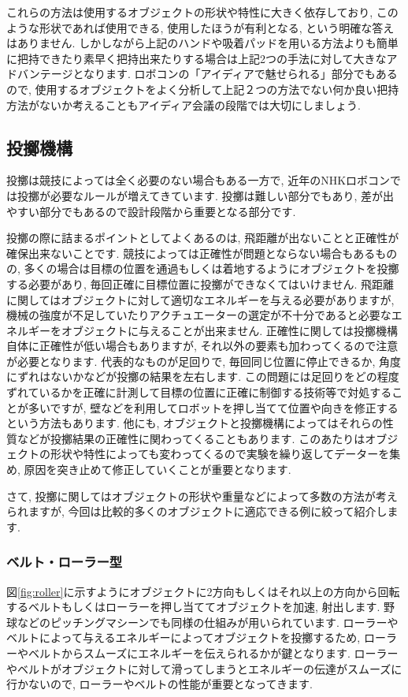 これらの方法は使用するオブジェクトの形状や特性に大きく依存しており, このような形状であれば使用できる, 使用したほうが有利となる, という明確な答えはありません. 
しかしながら上記のハンドや吸着パッドを用いる方法よりも簡単に把持できたり素早く把持出来たりする場合は上記2つの手法に対して大きなアドバンテージとなります. ロボコンの「アイディアで魅せられる」部分でもあるので, 使用するオブジェクトをよく分析して上記２つの方法でない何か良い把持方法がないか考えることもアイディア会議の段階では大切にしましょう.
\subsection{投擲機構}
投擲は競技によっては全く必要のない場合もある一方で, 近年のNHKロボコンでは投擲が必要なルールが増えてきています. 投擲は難しい部分でもあり, 差が出やすい部分でもあるので設計段階から重要となる部分です. 

投擲の際に詰まるポイントとしてよくあるのは, 飛距離が出ないことと正確性が確保出来ないことです. 競技によっては正確性が問題とならない場合もあるものの, 多くの場合は目標の位置を通過もしくは着地するようにオブジェクトを投擲する必要があり, 毎回正確に目標位置に投擲ができなくてはいけません. 
飛距離に関してはオブジェクトに対して適切なエネルギーを与える必要がありますが, 機械の強度が不足していたりアクチュエーターの選定が不十分であると必要なエネルギーをオブジェクトに与えることが出来ません. 正確性に関しては投擲機構自体に正確性が低い場合もありますが, それ以外の要素も加わってくるので注意が必要となります. 代表的なものが足回りで, 毎回同じ位置に停止できるか, 角度にずれはないかなどが投擲の結果を左右します. この問題には足回りをどの程度ずれているかを正確に計測して目標の位置に正確に制御する技術等で対処することが多いですが, 壁などを利用してロボットを押し当てて位置や向きを修正するという方法もあります. 
他にも, オブジェクトと投擲機構によってはそれらの性質などが投擲結果の正確性に関わってくることもあります. このあたりはオブジェクトの形状や特性によっても変わってくるので実験を繰り返してデーターを集め, 原因を突き止めて修正していくことが重要となります. 

さて, 投擲に関してはオブジェクトの形状や重量などによって多数の方法が考えられますが, 今回は比較的多くのオブジェクトに適応できる例に絞って紹介します. 
\subsubsection{ベルト・ローラー型}
図\ref{fig:roller}に示すようにオブジェクトに2方向もしくはそれ以上の方向から回転するベルトもしくはローラーを押し当ててオブジェクトを加速, 射出します. 野球などのピッチングマシーンでも同様の仕組みが用いられています. ローラーやベルトによって与えるエネルギーによってオブジェクトを投擲するため, ローラーやベルトからスムーズにエネルギーを伝えられるかが鍵となります. 
ローラーやベルトがオブジェクトに対して滑ってしまうとエネルギーの伝達がスムーズに行かないので, ローラーやベルトの性能が重要となってきます. 

